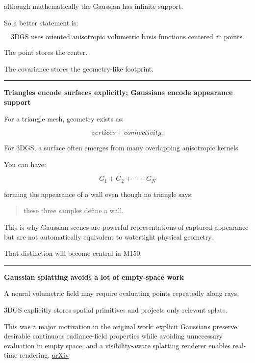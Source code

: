 although mathematically the Gaussian has infinite support.

So a better statement is:

\[
\boxed{
\text{3DGS uses oriented anisotropic volumetric basis functions centered at points.}
}
\]

The point stores the center.

The covariance stores the geometry-like footprint.

\begin{center}\rule{0.5\linewidth}{0.5pt}\end{center}

\textbf{Triangles encode surfaces explicitly; Gaussians encode appearance support}

For a triangle mesh, geometry exists as:

\[
vertices + connectivity.
\]

For 3DGS, a surface often emerges from many overlapping anisotropic kernels.

You can have:

\[
G_1+G_2+\cdots+G_N
\]

forming the appearance of a wall even though no triangle says:

\begin{quote}
these three samples define a wall.
\end{quote}

This is why Gaussian scenes are powerful representations of captured appearance but are not automatically equivalent to watertight physical geometry.

That distinction will become central in M150.

\begin{center}\rule{0.5\linewidth}{0.5pt}\end{center}

\textbf{Gaussian splatting avoids a lot of empty-space work}

A neural volumetric field may require evaluating points repeatedly along rays.

3DGS explicitly stores spatial primitives and projects only relevant splats.

This was a major motivation in the original work: explicit Gaussians preserve desirable continuous radiance-field properties while avoiding unnecessary evaluation in empty space, and a visibility-aware splatting renderer enables real-time rendering. \href{https://arxiv.org/abs/2308.04079?utm_source=chatgpt.com}{arXiv}

